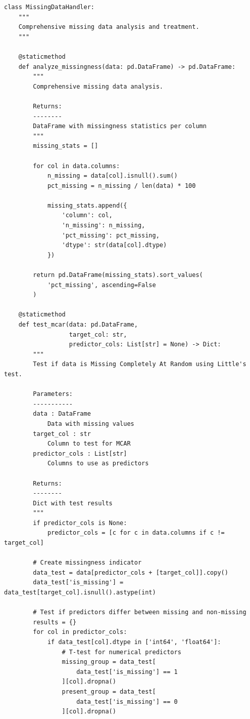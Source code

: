 \lstset{language=Python, caption=Missing Data Analysis and Imputation}
\begin{lstlisting}
class MissingDataHandler:
    """
    Comprehensive missing data analysis and treatment.
    """

    @staticmethod
    def analyze_missingness(data: pd.DataFrame) -> pd.DataFrame:
        """
        Comprehensive missing data analysis.

        Returns:
        --------
        DataFrame with missingness statistics per column
        """
        missing_stats = []

        for col in data.columns:
            n_missing = data[col].isnull().sum()
            pct_missing = n_missing / len(data) * 100

            missing_stats.append({
                'column': col,
                'n_missing': n_missing,
                'pct_missing': pct_missing,
                'dtype': str(data[col].dtype)
            })

        return pd.DataFrame(missing_stats).sort_values(
            'pct_missing', ascending=False
        )

    @staticmethod
    def test_mcar(data: pd.DataFrame,
                  target_col: str,
                  predictor_cols: List[str] = None) -> Dict:
        """
        Test if data is Missing Completely At Random using Little's test.

        Parameters:
        -----------
        data : DataFrame
            Data with missing values
        target_col : str
            Column to test for MCAR
        predictor_cols : List[str]
            Columns to use as predictors

        Returns:
        --------
        Dict with test results
        """
        if predictor_cols is None:
            predictor_cols = [c for c in data.columns if c != target_col]

        # Create missingness indicator
        data_test = data[predictor_cols + [target_col]].copy()
        data_test['is_missing'] = data_test[target_col].isnull().astype(int)

        # Test if predictors differ between missing and non-missing
        results = {}
        for col in predictor_cols:
            if data_test[col].dtype in ['int64', 'float64']:
                # T-test for numerical predictors
                missing_group = data_test[
                    data_test['is_missing'] == 1
                ][col].dropna()
                present_group = data_test[
                    data_test['is_missing'] == 0
                ][col].dropna()


\end{lstlisting}
